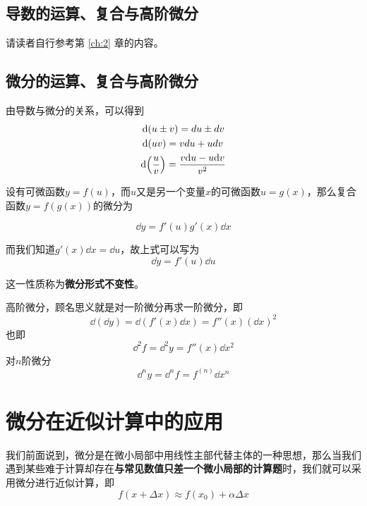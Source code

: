\subsection{导数的运算、复合与高阶微分}\label{sec:3.3.1}

请读者自行参考第 \ref{ch:2} 章的内容。

\subsection{微分的运算、复合与高阶微分}\label{sec:3.3.2}
由导数与微分的关系，可以得到
\begin{align*}
	&\dd (u\pm v)=du\pm dv\\
	&\dd(uv)=vdu+udv\\
	&\dd\qty(\frac{u}{v}) = \frac{v\dd u-u\dd v}{v^2}
\end{align*}

设有可微函数$y=f(u)$，而$u$又是另一个变量$x$的可微函数$u=g(x)$，那么复合函数$y=f(g(x))$的微分为

\begin{equation}
	\dd y = f'(u)g'(x)\dd x \label{eq:3.3}
\end{equation}

而我们知道$g'(x)\dd x = \dd u$，故上式可以写为
\begin{equation}
	\dd y = f'(u)\dd u \label{eq:3.4}
\end{equation}

这一性质称为\textbf{微分形式不变性}。

高阶微分，顾名思义就是对一阶微分再求一阶微分，即
\begin{equation*}
	\dd (\dd y) = \dd(f'(x)\dd x) = f''(x)(\dd x)^2
\end{equation*}
也即
\begin{equation}
	\dd^2 f = \dd^2 y = f''(x)\dd x^2\label{eq:3.5}
\end{equation}
对$n$阶微分
\begin{equation}
	\dd^n y = \dd^n f = f^{(n)}\dd x^n\label{eq:3.6}
\end{equation}

\section{微分在近似计算中的应用}\label{sec:3.4}
我们前面说到，微分是在微小局部中用线性主部代替主体的一种思想，那么当我们遇到某些难于计算却存在\textbf{与常见数值只差一个微小局部的计算题}时，我们就可以采用微分进行近似计算，即
\begin{equation}
	f(x+\Delta x)\approx f(x_0)+\alpha\Delta x\label{eq:3.7}
\end{equation}

